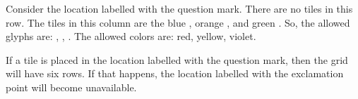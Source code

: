 Consider the location labelled with the question mark. There are no tiles in this row. The tiles in this column are the blue \smallat, orange \smallasterisk, and green \smalldollar. So, the allowed glyphs are: \smallpound, \smallpercent, \smallampersand. The allowed colors are: red, yellow, violet.

If a tile is placed in the location labelled with the question mark, then the grid will have six rows. If that happens, the location labelled with the exclamation point will become unavailable.%

